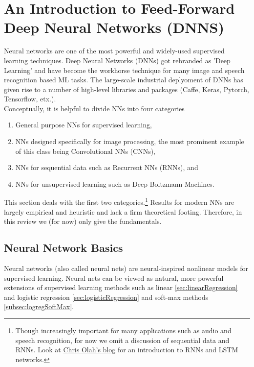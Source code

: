 \section{An Introduction to Feed-Forward Deep Neural Networks (DNNS)}
\label{sec:dnn}
 Neural networks are one of the most powerful and widely-used supervised learning techniques. Deep Neural Networks (DNNs) got rebranded as ’Deep Learning’ and have become the workhorse technique for many image and speech recognition based ML tasks. The large-scale industrial deplyoment of DNNs has given rise to a number of high-level libraries and packages (Caffe, Keras, Pytorch, Tensorflow, etx.).\\
 Conceptually, it is helpful to divide NNs into four categories 
 \begin{enumerate}
 	\item General purpose NNs for supervised learning,
 	\item NNs designed specifically for image processing, the most prominent example of this class being Convolutional NNs (CNNs), 
 	\item NNs for sequential data such as Recurrent NNs (RNNs), and
 	\item NNs for unsupervised learning such as Deep Boltzmann Machines.
 \end{enumerate}
This section deals with the first two categories.\footnote{Though increasingly important for many applications such as audio and speech recognition, for now we omit a discussion of sequential data and RNNs. Look at \href{https://colah.github.io/posts/2015-08-Understanding-LSTMs/}{Chris Olah's blog} for an introduction to RNNs and LSTM networks.}
Results for modern NNs are largely empirical and heuristic and lack a firm theoretical footing. Therefore, in this review we (for now) only give the fundamentals.

\subsection{Neural Network Basics}
Neural networks (also called neural nets) are neural-inspired nonlinear models for supervised learning. Neural nets can be viewed as natural, more powerful extensions of supervised learning methods such as linear \ref{sec:linearRegression} and logistic regression \ref{sec:logisticRegression} and soft-max methods \ref{subsec:logregSoftMax}.

